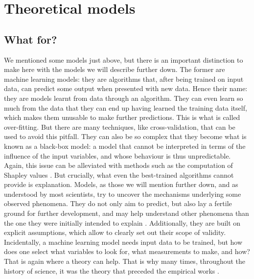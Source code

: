 \documentclass[../thesis.tex]{subfiles}
\begin{document}

\section{Theoretical models}


\subsection{What for?}
We mentioned some models just above, but there is an important distinction to make here
with the models we will describe further down. The former are machine learning models:
they are algorithms that, after being trained on input data, can predict some output
when presented with new data. Hence their name: they are models learnt from data through
an algorithm. They can even learn so much from the data that they can end up having
learned the training data itself, which makes them unusable to make further predictions.
This is what is called over-fitting. But there are many techniques, like
cross-validation, that can be used to avoid this pitfall. They can also be so complex
that they become what is known as a black-box model: a model that cannot be interpreted
in terms of the influence of the input variables, and whose behaviour is thus
unpredictable. Again, this issue can be alleviated with methods such as the computation
of Shapley values \cite{ShapleyNotesNPerson1951,StrumbeljExplainingPrediction2014}. But
crucially, what even the best-trained algorithms cannot provide is explanation. Models,
as those we will mention further down, and as understood by most scientists, try to
uncover the mechanisms underlying some observed phenomena. They do not only aim to
predict, but also lay a fertile ground for further development, and may help
understand other phenomena than the one they were initially intended to explain
\cite{EpsteinWhyModel2008}. Additionally, they are built on explicit assumptions, which
allow to clearly set out their scope of validity. Incidentally, a machine learning model
needs input data to be trained, but how does one select what variables to look for, what
measurements to make, and how? That is again where a theory can help. That is why many
times, throughout the history of science, it was the theory that preceded the empirical
works \cite{EpsteinWhyModel2008}.
\end{document}
